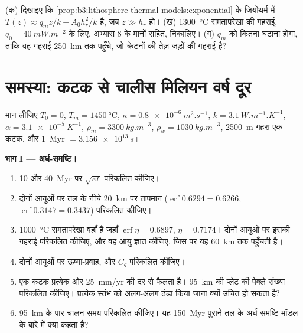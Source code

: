 \begin{exercise}[$\star\star\star$]\label{exo:b3:lithosphere-thermal-models:12}
(क) दिखाइए कि \cref{prop:b3:lithosphere-thermal-models:exponential} के जियोथर्म में
$T(z) \approx q_mz/k + A_0h_r^2/k$ है, जब $z \gg h_r$ हो। (ख)
\qty{1300}{\celsius} समतापरेखा की गहराई, $q_0 = \qty{40}{mW.m^{-2}}$ के लिए, अभ्यास 8 के मानों सहित, निकालिए।
(ग) $q_m$ को कितना घटाना होगा, ताकि वह गहराई
\qty{250}{km} तक पहुँचे, जो क्रेटनों की तेज़ जड़ों की गहराई है?
\end{exercise}

\section{समस्या: कटक से चालीस मिलियन वर्ष दूर}

\begin{problem}
\label{pb:b3:lithosphere-thermal-models:1}
मान लीजिए $T_0 = 0$, $T_m = \qty{1450}{\celsius}$, $\kappa =
\qty{0.8e-6}{m^2.s^{-1}}$, $k = \qty{3.1}{W.m^{-1}.K^{-1}}$, $\alpha =
\qty{3.1e-5}{K^{-1}}$, $\rho_m = \qty{3300}{kg.m^{-3}}$, $\rho_w =
\qty{1030}{kg.m^{-3}}$, \qty{2500}{m} गहरा एक कटक, और \qty{1}{Myr} $=
\qty{3.156e13}{s}$।

\medskip\noindent\textbf{भाग I --- अर्ध-समष्टि।}
\begin{enumerate}
  \item 10 और \qty{40}{Myr} पर $\sqrt{\kappa t}$ परिकलित कीजिए।
  \item दोनों आयुओं पर तल के नीचे \qty{20}{km} पर तापमान
        ($\operatorname{erf}0.6294 = 0.6266$, $\operatorname{erf}0.3147 =
        0.3437$) परिकलित कीजिए।
  \item \qty{1000}{\celsius} समतापरेखा वहाँ है जहाँ $\operatorname{erf}\eta =
        0.6897$, $\eta = 0.7174$। दोनों आयुओं पर इसकी गहराई परिकलित कीजिए, और
        वह आयु ज्ञात कीजिए, जिस पर यह \qty{60}{km} तक पहुँचती है।
  \item दोनों आयुओं पर ऊष्मा-प्रवाह, और $C_q$ परिकलित कीजिए।
  \item एक कटक प्रत्येक ओर \qty{25}{mm/yr} की दर से फैलता है। \qty{95}{km} की प्लेट की
        पेक्ले संख्या परिकलित कीजिए। प्रत्येक स्तंभ को अलग-अलग ठंडा किया जाना
        क्यों उचित हो सकता है?
  \item \qty{95}{km} के पार चालन-समय परिकलित कीजिए। यह
        \qty{150}{Myr} पुराने तल के अर्ध-समष्टि मॉडल के बारे में क्या कहता है?
\end{enumerate}


\end{problem}

